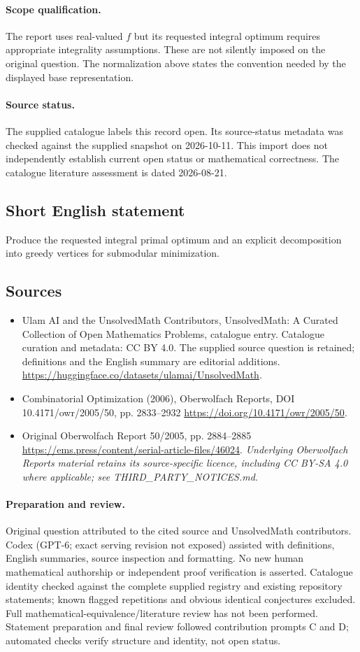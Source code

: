 \documentclass[11pt]{article}
\begin{document}
\paragraph{Scope qualification.}
The report uses real-valued $f$ but its requested integral optimum requires appropriate integrality assumptions. These are not silently imposed on the original question. The normalization above states the convention needed by the displayed base representation.
\paragraph{Source status.}
The supplied catalogue labels this record open. Its source-status metadata was checked against the supplied snapshot on 2026-10-11. This import does not independently establish current open status or mathematical correctness. The catalogue literature assessment is dated 2026-08-21.
\subsection{Short English statement}
Produce the requested integral primal optimum and an explicit decomposition into greedy vertices for submodular minimization.
\subsection{Sources}
\begin{itemize}
\item[S1] Ulam AI and the UnsolvedMath Contributors, UnsolvedMath: A Curated Collection of Open Mathematics Problems, catalogue entry. Catalogue curation and metadata: CC BY 4.0. The supplied source question is retained; definitions and the English summary are editorial additions.
\url{https://huggingface.co/datasets/ulamai/UnsolvedMath}.
\item[S2] Combinatorial Optimization (2006), Oberwolfach Reports, DOI 10.4171/owr/2005/50, pp. 2833--2932
\url{https://doi.org/10.4171/owr/2005/50}.
\item[S3] Original Oberwolfach Report 50/2005, pp. 2884--2885
\url{https://ems.press/content/serial-article-files/46024}.
\textit{Underlying Oberwolfach Reports material retains its source-specific licence, including CC BY-SA 4.0 where applicable; see THIRD\_PARTY\_NOTICES.md.}
\end{itemize}
\paragraph{Preparation and review.}
Original question attributed to the cited source and UnsolvedMath contributors. Codex (GPT-6; exact serving revision not exposed) assisted with definitions, English summaries, source inspection and formatting. No new human mathematical authorship or independent proof verification is asserted. Catalogue identity checked against the complete supplied registry and existing repository statements; known flagged repetitions and obvious identical conjectures excluded. Full mathematical-equivalence/literature review has not been performed. Statement preparation and final review followed contribution prompts C and D; automated checks verify structure and identity, not open status.
\label{end:statement}
\end{document}
